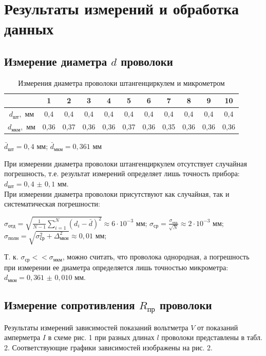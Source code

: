 \documentclass[a4paper]{article}
\begin{document}
\section{Результаты измерений и обработка данных}
\subsection{Измерение диаметра $d$ проволоки}
\vspace{-0.5cm}
\begin{table}[h]
\caption{Измерения диаметра проволоки штангенциркулем и микрометром}

\centering
\begin{tabular}{|c|c|c|c|c|c|c|c|c|c|c|}
\hline
& 1 & 2 & 3 & 4 & 5 & 6 & 7 & 8 & 9 & 10\\
\hline
$d_\text{шт},$ мм & 0,4 & 0,4 & 0,4 & 0,4 & 0,4 & 0,4 & 0,4 & 0,4 & 0,4 & 0,4\\
\hline
$d_\text{мкм},$ мм & 0,36 & 0,37 & 0,36 & 0,36 & 0,37 & 0,36 & 0,35 & 0,36 & 0,36 & 0,36\\
\hline
\end{tabular}
\end{table}
\centering
$\bar{d}_\text{шт} = 0,4$ мм; $\bar{d}_\text{мкм} = 0,361$ мм

\raggedright
При измерении диаметра проволоки штангенциркулем отсутствует случайная погрешность, т.е. результат измерений определяет лишь точность прибора:
$d_\text{шт} = 0,4$ $\pm$ $0,1$ мм. \\
При измерении диаметра проволоки присутствуют как случайная, так и систематическая погрешности:

\centering
 $ \sigma_\text{отд} = \sqrt{\frac{1}{N-1} \sum_{i=1}^{N} (d_i - \bar{d})^2} \approx   6 \cdot 10^{-3} $ мм;  
$\sigma_\text{ср} = \frac{\sigma_\text{отд}}{\sqrt{N}} \approx  2 \cdot 10^{-3} $ мм; 
$ \sigma_{\text{полн}} = \sqrt{\sigma_\text{ср}^2 + \Delta_\text{мкм}^2} \approx 0,01$ мм;

\raggedright
Т. к. $ \sigma_\text{ср} <<  \sigma_\text{мкм}$, можно считать, что проволока однородная,  а погрешность при измерении ее диаметра определяется лишь точностью микрометра: 
$d_\text{мкм} = 0,361$ $\pm$ $0,010$ мм. \\

\subsection{Измерение сопротивления $R_\text{пр}$ проволоки}

Результаты измерений зависимостей показаний вольтметра $V$ от показаний амперметра $I$ в
схеме рис. 1 при разных длинах $l$ проволоки представлены в табл. 2. Соответствующие графики
зависимостей изображены на рис. 2.
\end{document}
